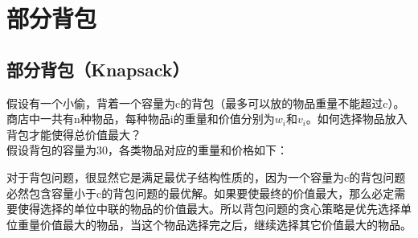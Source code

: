 \newpage

\section{部分背包}

\subsection{部分背包（Knapsack）}

假设有一个小偷，背着一个容量为c的背包（最多可以放的物品重量不能超过c）。商店中一共有n种物品，每种物品i的重量和价值分别为$ w_i $和$ v_i $。如何选择物品放入背包才能使得总价值最大？ \\

假设背包的容量为30，各类物品对应的重量和价格如下：

\begin{table}[H]
    \centering
    \caption{物品信息}
\end{table}

对于背包问题，很显然它是满足最优子结构性质的，因为一个容量为c的背包问题必然包含容量小于c的背包问题的最优解。如果要使最终的价值最大，那么必定需要使得选择的单位中联的物品的价值最大。所以背包问题的贪心策略是优先选择单位重量价值最大的物品，当这个物品选择完之后，继续选择其它价值最大的物品。 \\


